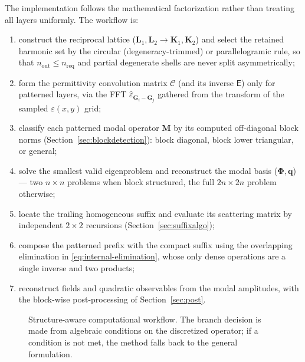 \documentclass[11pt]{article}
\theoremstyle{remark}
\newcommand{\eps}{\varepsilon}
\newcommand{\Cmat}{\mathcal{C}}
\newcommand{\epinv}{\mathsf{E}}
\newcommand{\Ph}{\mathbf{\Phi}}
\newcommand{\fq}{\mathbf{q}}
\begin{document}
The implementation follows the mathematical factorization rather than treating
all layers uniformly.  The workflow is:
\begin{enumerate}
\item construct the reciprocal lattice ($\mathbf{L}_1,\mathbf{L}_2\to
  \mathbf{K}_1,\mathbf{K}_2$) and select the retained harmonic set by the
  circular (degeneracy-trimmed) or parallelogramic rule, so that
  $n_{\mathrm{out}}\le n_{\mathrm{req}}$ and partial degenerate shells are
  never split asymmetrically;
\item form the permittivity convolution matrix $\Cmat$ (and its inverse
  $\epinv$) only for patterned layers, via the FFT
  $\hat\eps_{\mathbf{G}_i-\mathbf{G}_j}$ gathered from the transform of the
  sampled $\eps(x,y)$ grid;
\item classify each patterned modal operator $\mathbf{M}$ by its computed
  off-diagonal block norms (Section~\ref{sec:blockdetection}): block diagonal,
  block lower triangular, or general;
\item solve the smallest valid eigenproblem and reconstruct the modal basis
  ($\Ph,\fq$) --- two $n\times n$ problems when block structured, the full
  $2n\times2n$ problem otherwise;
\item locate the trailing homogeneous suffix and evaluate its scattering matrix
  by independent $2\times2$ recursions (Section~\ref{sec:suffixalgo});
\item compose the patterned prefix with the compact suffix using the
  overlapping elimination in \eqref{eq:internal-elimination}, whose only dense
  operations are a single inverse and two products;
\item reconstruct fields and quadratic observables from the modal amplitudes,
  with the block-wise post-processing of Section~\ref{sec:post}.
\end{enumerate}

\begin{figure}[t]
\centering
{}
\caption{Structure-aware computational workflow.  The branch decision is made
from algebraic conditions on the discretized operator; if a condition is not
met, the method falls back to the general formulation.}
\label{fig:workflow}
\end{figure}
\end{document}
